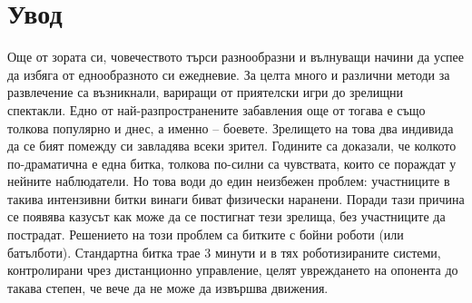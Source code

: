 \chapter{Увод}

Още от зората си, човечеството търси разнообразни и вълнуващи начини да успее да избяга от еднообразното си ежедневие. За целта много и различни методи за развлечение са възникнали, вариращи от приятелски игри до зрелищни спектакли. Едно от най-разпространените забавления още от тогава е също толкова популярно и днес, а именно – боевете. Зрелището на това два индивида да се бият помежду си завладява всеки зрител. Годините са доказали, че колкото по-драматична е една битка, толкова по-силни са чувствата, които се пораждат у нейните наблюдатели. Но това води до един неизбежен проблем: участниците в такива интензивни битки винаги биват физически наранени. Поради тази причина се появява казусът как може да се постигнат тези зрелища, без участниците да пострадат. Решението на този проблем са битките с бойни роботи (или батълботи). Стандартна битка трае 3 минути и в тях роботизираните системи, контролирани чрез дистанционно управление, целят увреждането на опонента до такава степен, че вече да не може да извършва движения.